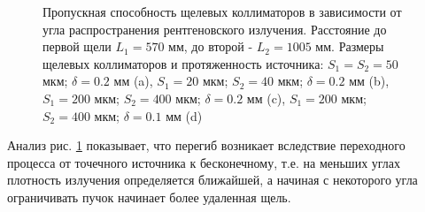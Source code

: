 \begin{figure}[H]
 \centering
 \hfill
 \hfill
 \hfill
 \caption{Пропускная способность щелевых коллиматоров в зависимости от угла распространения
 рентгеновского излучения. Расстояние до первой щели $L_1 = 570$ мм, до второй - $L_2 = 1005 $ мм.
 Размеры щелевых коллиматоров и протяженность источника:
   $S_1 = S_2 = 50$ мкм; $\delta = 0.2$ мм (a),
   $S_1 = 20$ мкм; $S_2 = 40$ мкм; $\delta = 0.2$ мм (b),
   $S_1 = 200$ мкм; $S_2 = 400$ мкм; $\delta = 0.2$ мм (c),
   $S_1 = 200$ мкм; $S_2 = 400$ мкм; $\delta = 0.1$ мм (d)}
 \label{ris:calc_slits_ability_res}
\end{figure}

Анализ рис. \ref{ris:calc_slits_ability_res} показывает, что перегиб  возникает вследствие переходного
процесса от точечного источника к бесконечному, т.е. на меньших углах плотность
излучения определяется ближайшей, а начиная с некоторого угла ограничивать пучок начинает
более удаленная щель.
